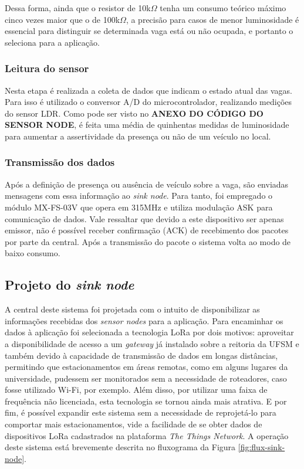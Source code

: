 \documentclass[oneside,openright,12pt]{ufsm_2015} %
\begin{document}
    Dessa forma, ainda que o resistor de 10k$\Omega$ tenha um consumo teórico máximo cinco vezes maior que o de 100k$\Omega$, a precisão para casos de menor luminosidade é essencial para distinguir se determinada vaga está ou não ocupada, e portanto o seleciona para a aplicação.
    
    \subsubsection{Leitura do sensor}
    Nesta etapa é realizada a coleta de dados que indicam o estado atual das vagas. Para isso é utilizado o conversor A/D do microcontrolador, realizando medições do sensor LDR. Como pode ser visto no \textbf{ANEXO DO CÓDIGO DO SENSOR NODE}, é feita uma média de quinhentas medidas de luminosidade para aumentar a assertividade da presença ou não de um veículo no local.
    
    \subsubsection{Transmissão dos dados}
    Após a definição de presença ou ausência de veículo sobre a vaga, são enviadas mensagens com essa informação ao \textit{sink node}. Para tanto, foi empregado o módulo MX-FS-03V que opera em 315MHz e utiliza modulação ASK para comunicação de dados. Vale ressaltar que devido a este dispositivo ser apenas emissor, não é possível receber confirmação (ACK) de recebimento dos pacotes por parte da central. Após a transmissão do pacote o sistema volta ao modo de baixo consumo.
    
    \subsection{Projeto do \textit{sink node}}
    A central deste sistema foi projetada com o intuito de disponibilizar as informações recebidas dos \textit{sensor nodes} para a aplicação. Para encaminhar os dados à aplicação foi selecionada a tecnologia LoRa por dois motivos: aproveitar a disponibilidade de acesso a um \textit{gateway} já instalado sobre a reitoria da UFSM e também devido à capacidade de transmissão de dados em longas distâncias, permitindo que estacionamentos em áreas remotas, como em alguns lugares da universidade, pudessem ser monitorados sem a necessidade de roteadores, caso fosse utilizado Wi-Fi, por exemplo. Além disso, por utilizar uma faixa de frequência não licenciada, esta tecnologia se tornou ainda mais atrativa. E por fim, é possível expandir este sistema sem a necessidade de reprojetá-lo para comportar mais estacionamentos, vide a facilidade de se obter dados de dispositivos LoRa cadastrados na plataforma \textit{The Things Network}. A operação deste sistema está brevemente descrita no fluxograma da Figura \ref{fig:flux-sink-node}.
    
\end{document}
